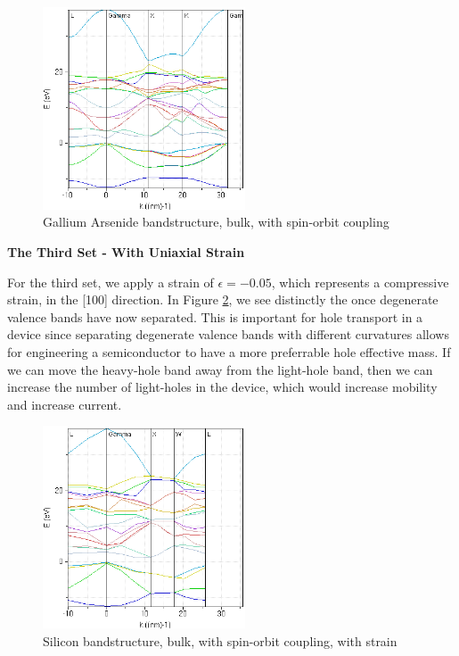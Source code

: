 \documentclass{IEEEtran}
\begin{document}
\begin{figure}[!ht] 
    \centering
    \includegraphics*[width = 6cm]{gaas-bands-secondset.png}
    \caption{Gallium Arsenide bandstructure, bulk, with spin-orbit coupling}
    \label{fig:gaas-second-set}
\end{figure}    

\textbf{The Third Set - With Uniaxial Strain}


For the third set, we apply a strain of \(\epsilon = -0.05\), which represents a compressive strain, in the [100] direction. In Figure \ref{fig:si-third-set}, we see distinctly the once degenerate valence bands have now separated. This is important for hole transport in a device since separating degenerate valence bands with different curvatures allows for engineering a semiconductor to have a more preferrable hole effective mass. If we can move the heavy-hole band away from the light-hole band, then we can increase the number of light-holes in the device, which would increase mobility and increase current.

\begin{figure}[!ht] 
    \centering
    \includegraphics*[width = 6cm]{si-bands-thirdset.png}
    \caption{Silicon bandstructure, bulk, with spin-orbit coupling, with strain}
    \label{fig:si-third-set}
\end{figure}    
\end{document}
